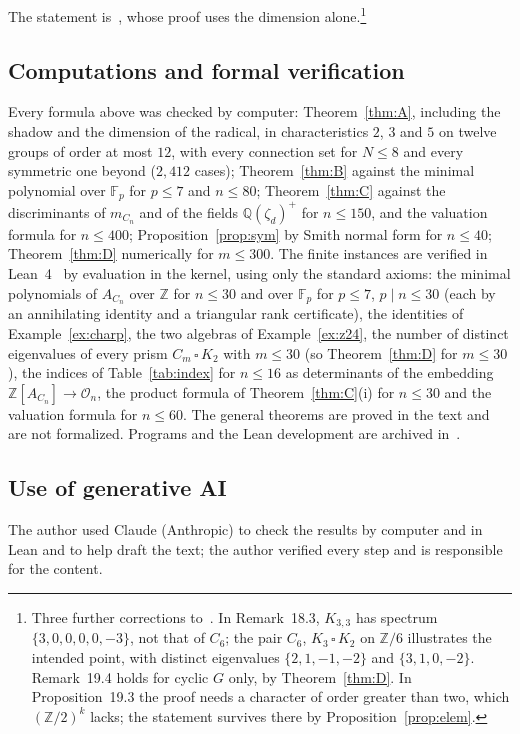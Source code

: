 \documentclass[11pt]{amsart}
\theoremstyle{definition}
\theoremstyle{remark}
\numberwithin{equation}{section}
\newcommand{\Q}{\mathbb{Q}}
\newcommand{\Z}{\mathbb{Z}}
\newcommand{\F}{\mathbb{F}}
\newcommand{\cO}{\mathcal{O}}
\begin{document}
The statement is~\cite[Proposition~18.4]{BMB}, whose proof uses the dimension alone.\footnote{Three further corrections to~\cite{BMB}. In Remark~18.3, $K_{3,3}$ has spectrum $\{3,0,0,0,0,-3\}$, not that of $C_6$; the pair $C_6$, $K_3\,\square\,K_2$ on $\Z/6$ illustrates the intended point, with distinct eigenvalues $\{2,1,-1,-2\}$ and $\{3,1,0,-2\}$. Remark~19.4 holds for cyclic $G$ only, by Theorem~\ref{thm:D}. In Proposition~19.3 the proof needs a character of order greater than two, which $(\Z/2)^k$ lacks; the statement survives there by Proposition~\ref{prop:elem}.}

\subsection*{Computations and formal verification}
Every formula above was checked by computer: Theorem~\ref{thm:A}, including the shadow and the dimension of the radical, in characteristics $2$, $3$ and $5$ on twelve groups of order at most $12$, with every connection set for $N\le8$ and every symmetric one beyond ($2{,}412$ cases); Theorem~\ref{thm:B} against the minimal polynomial over $\F_p$ for $p\le7$ and $n\le80$; Theorem~\ref{thm:C} against the discriminants of $m_{C_n}$ and of the fields $\Q(\zeta_d)^+$ for $n\le150$, and the valuation formula for $n\le400$; Proposition~\ref{prop:sym} by Smith normal form for $n\le40$; Theorem~\ref{thm:D} numerically for $m\le300$. The finite instances are verified in Lean~4~\cite{MU} by evaluation in the kernel, using only the standard axioms: the minimal polynomials of $A_{C_n}$ over $\Z$ for $n\le30$ and over $\F_p$ for $p\le7$, $p\mid n\le30$ (each by an annihilating identity and a triangular rank certificate), the identities of Example~\ref{ex:charp}, the two algebras of Example~\ref{ex:z24}, the number of distinct eigenvalues of every prism $C_m\,\square\,K_2$ with $m\le30$ (so Theorem~\ref{thm:D} for $m\le30$), the indices of Table~\ref{tab:index} for $n\le16$ as determinants of the embedding $\Z[A_{C_n}]\to\cO_n$, the product formula of Theorem~\ref{thm:C}(i) for $n\le30$ and the valuation formula for $n\le60$. The general theorems are proved in the text and are not formalized. Programs and the Lean development are archived in~\cite{Ar}.

\subsection*{Use of generative AI}
The author used Claude (Anthropic) to check the results by computer and in Lean and to help draft the text; the author verified every step and is responsible for the content.
\end{document}
